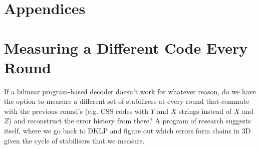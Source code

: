 \documentclass[a4paper, english]{scrartcl}
\begin{document}
\section*{Appendices}
\appendix
\section{Measuring a Different Code Every Round}
If a bilinear program-based decoder doesn't work for whatever reason, do we have the option to measure a different set of stabilisers at every round that commute with the previous round's (e.g. CSS codes with $Y$ and $X$ strings instead of $X$ and $Z$) and reconstruct the error history from there?
A program of research suggests itself, where we go back to DKLP and figure out which errors form chains in 3D given the cycle of stabilisers that we measure. 
\end{document}
